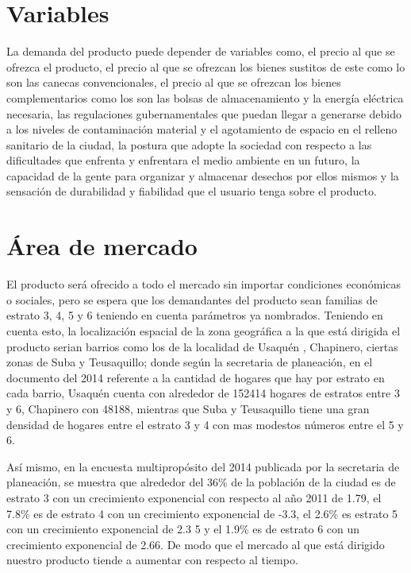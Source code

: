\documentclass{report}
\begin{document}
    \section{Variables}
    La demanda del producto puede depender de variables como, el precio al que se ofrezca el producto, el precio al que se ofrezcan los bienes sustitos de este como lo son las canecas convencionales, el precio al que se ofrezcan los bienes complementarios como los son las bolsas de almacenamiento y la energía eléctrica necesaria,  las regulaciones gubernamentales que puedan llegar a generarse debido a los niveles de contaminación material y el agotamiento de espacio en el relleno sanitario de la ciudad,  la postura que adopte la sociedad con respecto a las dificultades que enfrenta y enfrentara el medio ambiente en un futuro, la capacidad de la gente para organizar y almacenar desechos por ellos mismos y la sensación de durabilidad y fiabilidad que el usuario tenga sobre el producto.
    
    \section{Área de mercado}
    El producto será ofrecido a todo el mercado sin importar condiciones económicas o sociales, pero se espera que los demandantes del producto sean  familias de estrato 3, 4, 5 y 6 teniendo en cuenta parámetros ya nombrados. Teniendo en cuenta esto, la localización espacial de la zona geográfica a la que está dirigida el producto serian barrios como los de la localidad de Usaquén , Chapinero, ciertas zonas de Suba y Teusaquillo; donde según la secretaria de planeación, en el documento del 2014 referente a la cantidad de hogares que hay por estrato en cada barrio, Usaquén cuenta con alrededor de 152414 hogares de estratos entre 3 y 6, Chapinero con 48188, mientras que Suba y Teusaquillo tiene una gran densidad de hogares entre el estrato 3 y 4 con mas modestos números entre el 5 y 6.
    
    Así mismo, en la encuesta multipropósito del 2014 publicada por la secretaria de planeación, se muestra que  alrededor del 36\% de la población de la ciudad es de estrato 3 con un crecimiento exponencial con respecto al año 2011 de 1.79, el 7.8\%  es de estrato 4 con un crecimiento exponencial de -3.3, el 2.6\% es estrato 5 con un crecimiento exponencial de 2.3 5 y el 1.9\% es de estrato 6 con un crecimiento exponencial de 2.66. De modo que el mercado al que está dirigido nuestro producto tiende a aumentar con respecto al tiempo.
    
\end{document}
